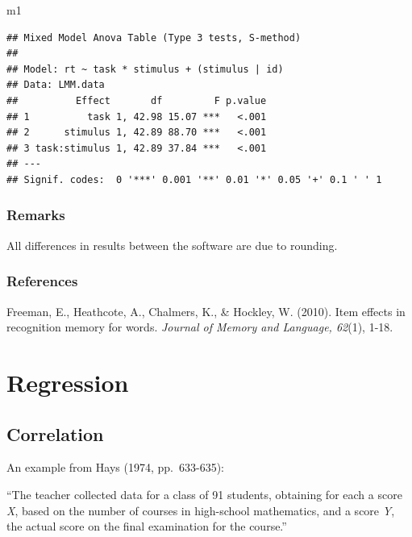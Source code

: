\documentclass[
]{book}
\newenvironment{Shaded}{\begin{snugshade}}{\end{snugshade}}
\newcommand{\NormalTok}[1]{#1}
\begin{document}
\begin{Shaded}
\begin{Highlighting}[]
\NormalTok{m1}
\end{Highlighting}
\end{Shaded}

\begin{verbatim}
## Mixed Model Anova Table (Type 3 tests, S-method)
## 
## Model: rt ~ task * stimulus + (stimulus | id)
## Data: LMM.data
##          Effect       df         F p.value
## 1          task 1, 42.98 15.07 ***   <.001
## 2      stimulus 1, 42.89 88.70 ***   <.001
## 3 task:stimulus 1, 42.89 37.84 ***   <.001
## ---
## Signif. codes:  0 '***' 0.001 '**' 0.01 '*' 0.05 '+' 0.1 ' ' 1
\end{verbatim}

\hypertarget{remarks}{%
\subsection{Remarks}\label{remarks}}

All differences in results between the software are due to rounding.

\hypertarget{references}{%
\subsection{References}\label{references}}

Freeman, E., Heathcote, A., Chalmers, K., \& Hockley, W. (2010). Item effects in recognition memory for words. \emph{Journal of Memory and Language, 62}(1), 1-18.

\hypertarget{regression}{%
\chapter{Regression}\label{regression}}

\hypertarget{correlation}{%
\section{Correlation}\label{correlation}}

An example from Hays (1974, pp.~633-635):

``The teacher collected data for a class of 91 students, obtaining for each a score \emph{X}, based on the number of courses in high-school mathematics, and a score \emph{Y}, the actual score on the final examination for the course.''
\end{document}
